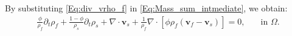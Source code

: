 By substituting \eqref{Eq:div_vrho_f} in \eqref{Eq:Mass_sum_intmediate}, we obtain:
\begin{equation}\label{Eq:Mass_Conserv_sum_darcy}
\begin{aligned}
\frac{\phi}{\rho_f}\partial_t\rho_f +\frac{1-\phi}{\rho_s}\partial_t\rho_s+\nabla\cdot\mathbf{v}_s+\frac{1}{\rho_f} \nabla\cdot \left[\phi \rho_f \left(\mathbf{v}_f-\mathbf{v}_s \right)\right] =0,  \quad  &\text{in~} \Omega.
\end{aligned}
\end{equation}

